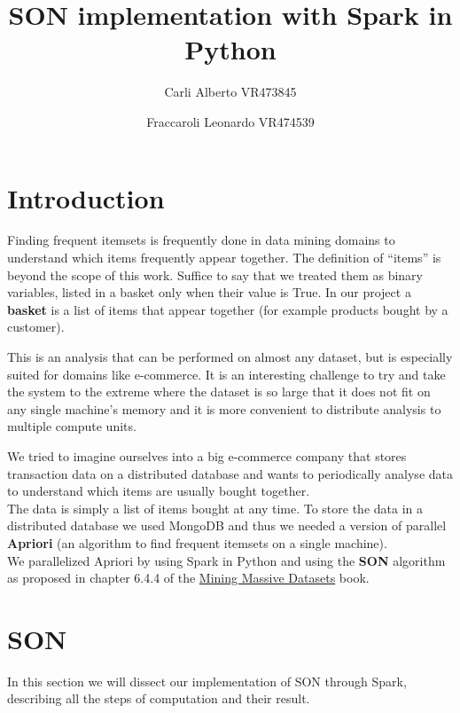 \documentclass[a4paper]{article}
\title{SON implementation with Spark in Python}
\author{Carli Alberto VR473845\and Fraccaroli Leonardo VR474539}
\date{}
\begin{document}
	\maketitle
	\tableofcontents
	\newpage
	\section{Introduction}
	Finding frequent itemsets is frequently done in data mining domains to understand which items frequently appear together. The definition of ``items'' is beyond the scope of this work. Suffice to say that we treated them as binary variables, listed in a basket only when their value is True. In our project a \textbf{basket} is a list of items that appear together (for example products bought by a customer).
	
	This is an analysis that can be performed on almost any dataset, but is especially suited for domains like e-commerce. It is an interesting challenge to try and take the system to the extreme where the dataset is so large that it does not fit on any single machine's memory and it is more convenient to distribute analysis to multiple compute units.
	
	We tried to imagine ourselves into a big e-commerce company that stores transaction data on a distributed database and wants to periodically analyse data to understand which items are usually bought together. \\
	The data is simply a list of items bought at any time. To store the data in a distributed database we used MongoDB and thus we needed a version of parallel \textbf{Apriori} (an algorithm to find frequent itemsets on a single machine). \\
	We parallelized Apriori by using Spark in Python and using the \textbf{SON} algorithm as proposed in chapter 6.4.4 of the \href{http://www.mmds.org/}{Mining Massive Datasets} book.
	\newpage

	\section{SON}
	In this section we will dissect our implementation of SON through Spark, describing all the steps of computation and their result.
	
\end{document}
